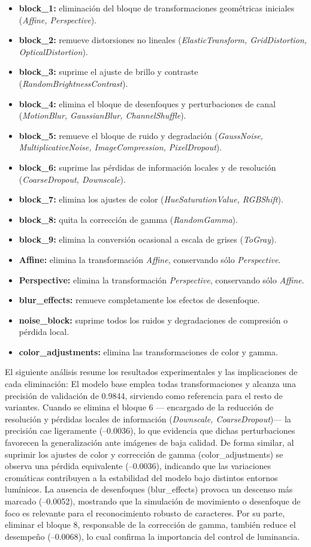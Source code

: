 \begin{itemize}
\item \textbf{block\_1:} eliminación del bloque de transformaciones geométricas iniciales (\emph{Affine, Perspective}).
\item \textbf{block\_2:} remueve distorsiones no lineales (\emph{ElasticTransform, GridDistortion, OpticalDistortion}).
\item \textbf{block\_3:} suprime el ajuste de brillo y contraste (\emph{RandomBrightnessContrast}).
\item \textbf{block\_4:} elimina el bloque de desenfoques y perturbaciones de canal 
	(\emph{MotionBlur, GaussianBlur, ChannelShuffle}).
\item \textbf{block\_5:} remueve el bloque de ruido y degradación
	(\emph{GaussNoise, MultiplicativeNoise, ImageCompression, PixelDropout}).
\item \textbf{block\_6:} suprime las pérdidas de información locales y de resolución (\emph{CoarseDropout, Downscale}).
\item \textbf{block\_7:} elimina los ajustes de color (\emph{HueSaturationValue, RGBShift}).
\item \textbf{block\_8:} quita la corrección de gamma (\emph{RandomGamma}).
\item \textbf{block\_9:} elimina la conversión ocasional a escala de grises (\emph{ToGray}).
\item \textbf{Affine:} elimina la transformación \emph{Affine}, conservando sólo \emph{Perspective}.
\item \textbf{Perspective:} elimina la transformación \emph{Perspective}, conservando sólo \emph{Affine}.
\item \textbf{blur\_effects:} remueve completamente los efectos de desenfoque.
\item \textbf{noise\_block:} suprime todos los ruidos y degradaciones de compresión o pérdida local.
\item \textbf{color\_adjustments:} elimina las transformaciones de color y gamma.
\end{itemize}

El siguiente análisis resume los resultados experimentales y las implicaciones de cada eliminación:
El modelo base emplea todas transformaciones y alcanza una precisión de validación de 0.9844,
sirviendo como referencia para el resto de variantes. 
Cuando se elimina el bloque 6 ---
encargado de la reducción de resolución y pérdidas locales de información (\emph{Downscale, CoarseDropout})---
la precisión cae ligeramente (–0.0036), lo que evidencia que dichas perturbaciones favorecen 
la generalización ante imágenes de baja calidad.
De forma similar, al suprimir los ajustes de color y corrección de gamma (color\_adjustments)
se observa una pérdida equivalente (–0.0036), indicando que las variaciones cromáticas contribuyen 
a la estabilidad del modelo bajo distintos entornos lumínicos.
La ausencia de desenfoques (blur\_effects) provoca un descenso más marcado (–0.0052),
mostrando que la simulación de movimiento o desenfoque de foco es relevante para el reconocimiento robusto de caracteres.
Por su parte, eliminar el bloque 8, responsable de la corrección de gamma,
también reduce el desempeño (–0.0068), lo cual confirma la importancia del control de luminancia.

